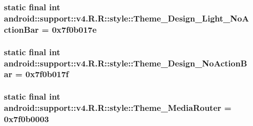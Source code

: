 \hypertarget{classandroid_1_1support_1_1v4_1_1_r_1_1style_9c0933f9ed1a51b76af96930fac3eef7}{
\subsubsection[{Theme\_\-Design\_\-Light\_\-NoActionBar}]{\setlength{\rightskip}{0pt plus 5cm}static final int android::support::v4.R.R::style::Theme\_\-Design\_\-Light\_\-NoActionBar = 0x7f0b017e}}
\label{classandroid_1_1support_1_1v4_1_1_r_1_1style_9c0933f9ed1a51b76af96930fac3eef7}


\hypertarget{classandroid_1_1support_1_1v4_1_1_r_1_1style_e827b694d67f7de422fbb6222f84d808}{
\subsubsection[{Theme\_\-Design\_\-NoActionBar}]{\setlength{\rightskip}{0pt plus 5cm}static final int android::support::v4.R.R::style::Theme\_\-Design\_\-NoActionBar = 0x7f0b017f}}
\label{classandroid_1_1support_1_1v4_1_1_r_1_1style_e827b694d67f7de422fbb6222f84d808}


\hypertarget{classandroid_1_1support_1_1v4_1_1_r_1_1style_04ef8f081e632316cd31a54b359e4fb3}{
\subsubsection[{Theme\_\-MediaRouter}]{\setlength{\rightskip}{0pt plus 5cm}static final int android::support::v4.R.R::style::Theme\_\-MediaRouter = 0x7f0b0003}}
\label{classandroid_1_1support_1_1v4_1_1_r_1_1style_04ef8f081e632316cd31a54b359e4fb3}


